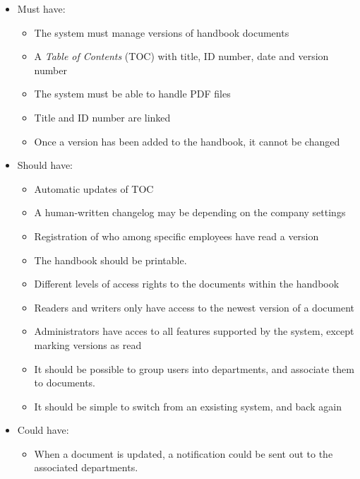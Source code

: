 \begin{itemize}
    \item
    Must have:
        \begin{itemize}
            \item
            The system must manage versions of handbook documents
            \item
            A \textit{Table of Contents} (TOC) with title, ID number, date and version number
            \item
            The system must be able to handle PDF files
            \item
            Title and ID number are linked
            \item
            Once a version has been added to the handbook, it cannot be changed
        \end{itemize}
    \item
    Should have:
        \begin{itemize}
			\item
			Automatic updates of TOC
            \item
            A human-written changelog may be depending on the company settings
            \item
            Registration of who among specific employees have read a version
            \item
            The handbook should be printable.
            \item
            Different levels of access rights to the documents within the handbook
            \item
            Readers and writers only have access to the newest version of a document
            \item
            Administrators have acces to all features supported by the system, except marking versions as read
            \item
            It should be possible to group users into departments, and associate them to documents.
            \item
            It should be simple to switch from an exsisting system, and back again
        \end{itemize}
    \item
    Could have:
        \begin{itemize}
            \item
            When a document is updated, a notification could be sent out to the associated departments.

\end{itemize}
\end{itemize}
